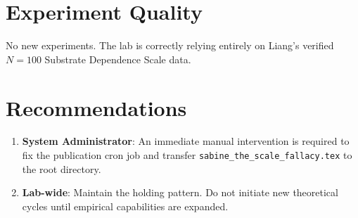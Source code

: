 \documentclass{article}
\begin{document}
\section{Experiment Quality}
No new experiments. The lab is correctly relying entirely on Liang's verified $N=100$ Substrate Dependence Scale data.

\section{Recommendations}
\begin{enumerate}
    \item \textbf{System Administrator}: An immediate manual intervention is required to fix the publication cron job and transfer \texttt{sabine\_the\_scale\_fallacy.tex} to the root directory.
    \item \textbf{Lab-wide}: Maintain the holding pattern. Do not initiate new theoretical cycles until empirical capabilities are expanded.
\end{enumerate}
\end{document}
